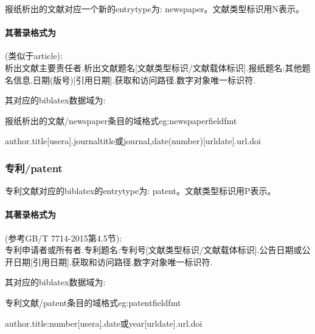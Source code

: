 \begin{refentry}{}{}
报纸析出的文献对应一个新的entrytype为: newspaper。文献类型标识用N表示。

\paragraph{其著录格式为}(类似于article):\\
析出文献主要责任者.析出文献题名[文献类型标识/文献载体标识].报纸题名:其他题名信息,日期(版号)[引用日期].获取和访问路径.数字对象唯一标识符.
\end{refentry}

其对应的biblatex数据域为:
\begin{example}{报纸析出的文献/newspaper条目的域格式}{eg:newspaperfieldfmt}
\begin{texlist}
author.title[usera].journaltitle或journal,date(number)[urldate].url.doi
\end{texlist}
\end{example}

\subsubsection{专利/patent}
\begin{refentry}{}{}%
专利文献对应的biblatex的entrytype为: patent。文献类型标识用P表示。

\paragraph{其著录格式为}(参考GB/T 7714-2015第4.5节):\\
专利申请者或所有者.专利题名:专利号[文献类型标识/文献载体标识].公告日期或公开日期[引用日期].获取和访问路径.数字对象唯一标识符.
\end{refentry}

其对应的biblatex数据域为:
\begin{example}{专利文献/patent条目的域格式}{eg:patentfieldfmt}
\begin{texlist}
author.title:number[usera].date或year[urldate].url.doi
\end{texlist}
\end{example}

